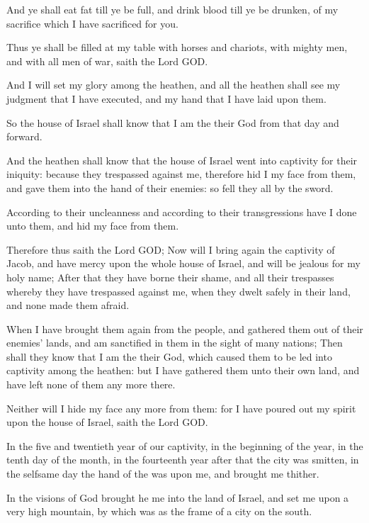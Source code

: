 \Verse And ye shall eat fat till ye be full, and drink blood till ye be drunken, of my sacrifice which I have sacrificed for you.

\Verse Thus ye shall be filled at my table with horses and chariots, with mighty men, and with all men of war, saith the Lord GOD.

\Verse And I will set my glory among the heathen, and all the heathen shall see my judgment that I have executed, and my hand that I have laid upon them.

\Verse So the house of Israel shall know that I am the \LORD their God from that day and forward.

\Verse And the heathen shall know that the house of Israel went into captivity for their iniquity: because they trespassed against me, therefore hid I my face from them, and gave them into the hand of their enemies: so fell they all by the sword.

\Verse According to their uncleanness and according to their transgressions have I done unto them, and hid my face from them.

\Verse Therefore thus saith the Lord GOD; Now will I bring again the captivity of Jacob, and have mercy upon the whole house of Israel, and will be jealous for my holy name; \Verse After that they have borne their shame, and all their trespasses whereby they have trespassed against me, when they dwelt safely in their land, and none made them afraid.

\Verse When I have brought them again from the people, and gathered them out of their enemies' lands, and am sanctified in them in the sight of many nations; \Verse Then shall they know that I am the \LORD their God, which caused them to be led into captivity among the heathen: but I have gathered them unto their own land, and have left none of them any more there.

\Verse Neither will I hide my face any more from them: for I have poured out my spirit upon the house of Israel, saith the Lord GOD.


\Chapter
\Verse In the five and twentieth year of our captivity, in the beginning of the year, in the tenth day of the month, in the fourteenth year after that the city was smitten, in the selfsame day the hand of the \LORD was upon me, and brought me thither.

\Verse In the visions of God brought he me into the land of Israel, and set me upon a very high mountain, by which was as the frame of a city on the south.

